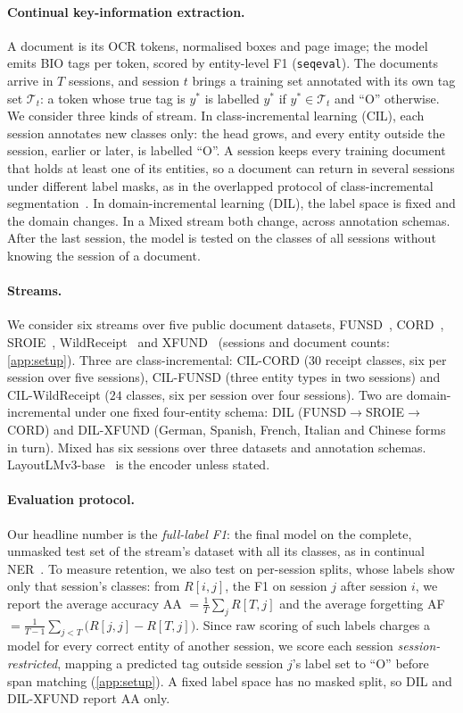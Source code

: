 \documentclass[10pt,twocolumn,letterpaper]{article}
\begin{document}
\paragraph{Continual key-information extraction.} A document is its OCR tokens, normalised boxes and page image; the model emits BIO tags per token, scored by entity-level F1 (\texttt{seqeval}). The documents arrive in $T$ sessions, and session $t$ brings a training set annotated with its own tag set $\mathcal{T}_t$: a token whose true tag is $y^{\ast}$ is labelled $y^{\ast}$ if $y^{\ast}\in\mathcal{T}_t$ and ``O'' otherwise. We consider three kinds of stream. In class-incremental learning (CIL), each session annotates new classes only: the head grows, and every entity outside the session, earlier or later, is labelled ``O''. A session keeps every training document that holds at least one of its entities, so a document can return in several sessions under different label masks, as in the overlapped protocol of class-incremental segmentation~\citep{cermelli2020mib}. In domain-incremental learning (DIL), the label space is fixed and the domain changes. In a Mixed stream both change, across annotation schemas. After the last session, the model is tested on the classes of all sessions without knowing the session of a document.

\paragraph{Streams.} We consider six streams over five public document datasets, FUNSD~\citep{jaume2019funsd}, CORD~\citep{park2019cord}, SROIE~\citep{huang2019sroie}, WildReceipt~\citep{sun2021sdmgr} and XFUND~\citep{xu2022xfund} (sessions and document counts: \cref{app:setup}). Three are class-incremental: CIL-CORD ($30$ receipt classes, six per session over five sessions), CIL-FUNSD (three entity types in two sessions) and CIL-WildReceipt ($24$ classes, six per session over four sessions). Two are domain-incremental under one fixed four-entity schema: DIL (FUNSD$\rightarrow$SROIE$\rightarrow$CORD) and DIL-XFUND (German, Spanish, French, Italian and Chinese forms in turn). Mixed has six sessions over three datasets and annotation schemas. LayoutLMv3-base~\citep{huang2022layoutlmv3} is the encoder unless stated.
\paragraph{Evaluation protocol.} Our headline number is the \emph{full-label F1}: the final model on the complete, unmasked test set of the stream's dataset with all its classes, as in continual NER~\citep{ma2023learning}. To measure retention, we also test on per-session splits, whose labels show only that session's classes: from $R[i,j]$, the F1 on session $j$ after session $i$, we report the average accuracy AA $=\tfrac1T\sum_j R[T,j]$ and the average forgetting AF $=\tfrac1{T-1}\sum_{j<T}\big(R[j,j]-R[T,j]\big)$. Since raw scoring of such labels charges a model for every correct entity of another session, we score each session \emph{session-restricted}, mapping a predicted tag outside session $j$'s label set to ``O'' before span matching (\cref{app:setup}). A fixed label space has no masked split, so DIL and DIL-XFUND report AA only.
\end{document}
